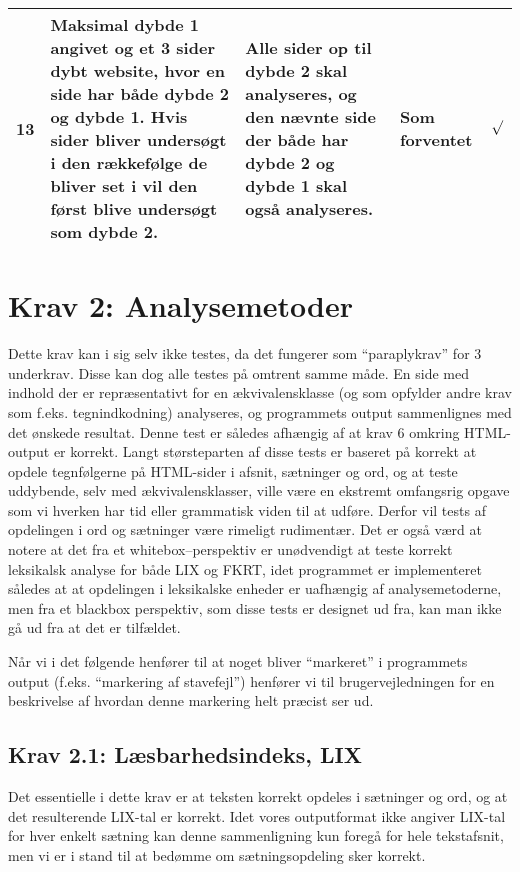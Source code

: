 \documentclass[a4paper,oneside,article]{memoir}
\begin{document}
\begin{landscape}
\begin{longtable}[c]{p{20pt}|p{220pt}|p{130pt}|p{130pt}|r}
13 &
Maksimal dybde 1 angivet og et 3 sider dybt website, hvor en side har
både dybde 2 og dybde 1. Hvis sider bliver undersøgt i den rækkefølge de
bliver set i vil den først blive undersøgt som dybde 2. &
Alle sider op til dybde 2 skal analyseres, og den nævnte side der både
har dybde 2 og dybde 1 skal også analyseres. &
Som forventet &
$\surd$ \\ \hline

\end{longtable}

\section{Krav 2: Analysemetoder}

Dette krav kan i sig selv ikke testes, da det fungerer som
``paraplykrav'' for 3 underkrav. Disse kan dog alle testes på omtrent
samme måde. En side med indhold der er repræsentativt for en
ækvivalensklasse (og som opfylder andre krav som
f.eks. tegnindkodning) analyseres, og programmets output sammenlignes
med det ønskede resultat. Denne test er således afhængig af at krav 6
omkring HTML-output er korrekt. Langt størsteparten af disse tests er
baseret på korrekt at opdele tegnfølgerne på HTML-sider i afsnit,
sætninger og ord, og at teste uddybende, selv med ækvivalensklasser,
ville være en ekstremt omfangsrig opgave som vi hverken har tid eller
grammatisk viden til at udføre. Derfor vil tests af opdelingen i ord
og sætninger være rimeligt rudimentær. Det er også værd at notere at
det fra et whitebox--perspektiv er unødvendigt at teste korrekt
leksikalsk analyse for både LIX og FKRT, idet programmet er
implementeret således at at opdelingen i leksikalske enheder er
uafhængig af analysemetoderne, men fra et blackbox perspektiv, som
disse tests er designet ud fra, kan man ikke gå ud fra at det er
tilfældet.

Når vi i det følgende henfører til at noget bliver ``markeret'' i
programmets output (f.eks. ``markering af stavefejl'') henfører vi til
brugervejledningen for en beskrivelse af hvordan denne markering helt
præcist ser ud.

\subsection{Krav 2.1: Læsbarhedsindeks, LIX}

Det essentielle i dette krav er at teksten korrekt opdeles i sætninger
og ord, og at det resulterende LIX-tal er korrekt. Idet vores
outputformat ikke angiver LIX-tal for hver enkelt sætning kan denne
sammenligning kun foregå for hele tekstafsnit, men vi er i stand til
at bedømme om sætningsopdeling sker korrekt.


\end{landscape}
\end{document}

